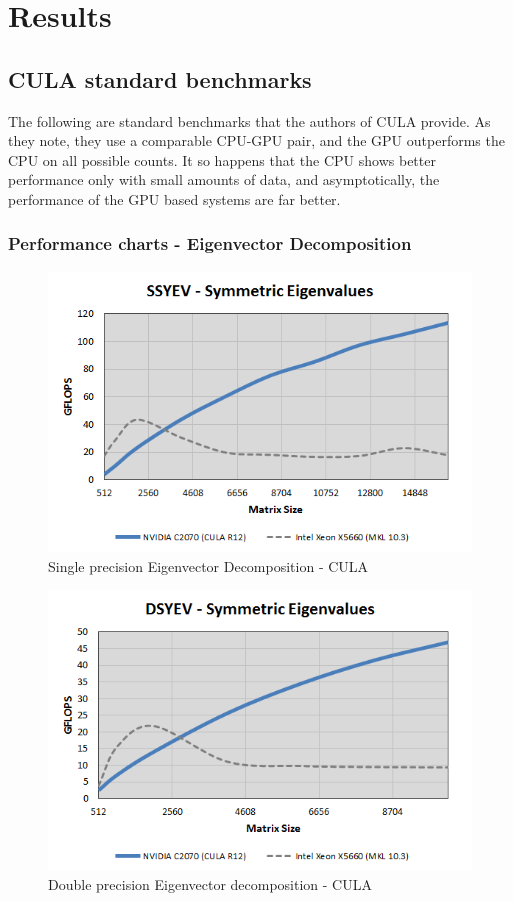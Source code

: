 \documentclass[submit]{aiaa-tc_mod}%
\begin{document}
\section{Results}

\subsection{CULA standard benchmarks}

The following are standard benchmarks that the authors of CULA provide. As they note, they use a comparable CPU-GPU pair, and the GPU outperforms the CPU on all possible counts. It so happens that the CPU shows better performance only with small amounts of data, and asymptotically, the performance of the GPU based systems are far better. 

\subsubsection{Performance charts - Eigenvector Decomposition}


\begin{figure}[H]
 \includegraphics[width=\textwidth]{SSYEV_N.png}
 \caption{Single precision Eigenvector Decomposition - CULA}
 \label{ssyev}
\end{figure}

\begin{figure}[H]
 \includegraphics[width=\textwidth]{DSYEV_N.png}
 \caption{Double precision Eigenvector decomposition - CULA}
 \label{dsyev}
\end{figure}
\end{document}
